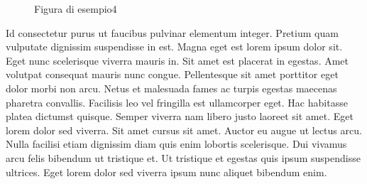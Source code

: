 \documentclass[a4]{report}
\begin{document}
\begin{figure}
  \centering
  \caption{Figura di esempio4}\label{fig:4}
  \par
\end{figure}
Id consectetur purus ut faucibus pulvinar elementum integer. Pretium quam vulputate dignissim suspendisse in est. Magna eget est lorem ipsum dolor sit. Eget nunc scelerisque viverra mauris in. Sit amet est placerat in egestas. Amet volutpat consequat mauris nunc congue. Pellentesque sit amet porttitor eget dolor morbi non arcu. Netus et malesuada fames ac turpis egestas maecenas pharetra convallis. Facilisis leo vel fringilla est ullamcorper eget. Hac habitasse platea dictumst quisque. Semper viverra nam libero justo laoreet sit amet. Eget lorem dolor sed viverra. Sit amet cursus sit amet. Auctor eu augue ut lectus arcu. Nulla facilisi etiam dignissim diam quis enim lobortis scelerisque. Dui vivamus arcu felis bibendum ut tristique et. Ut tristique et egestas quis ipsum suspendisse ultrices. Eget lorem dolor sed viverra ipsum nunc aliquet bibendum enim.
\end{document}
